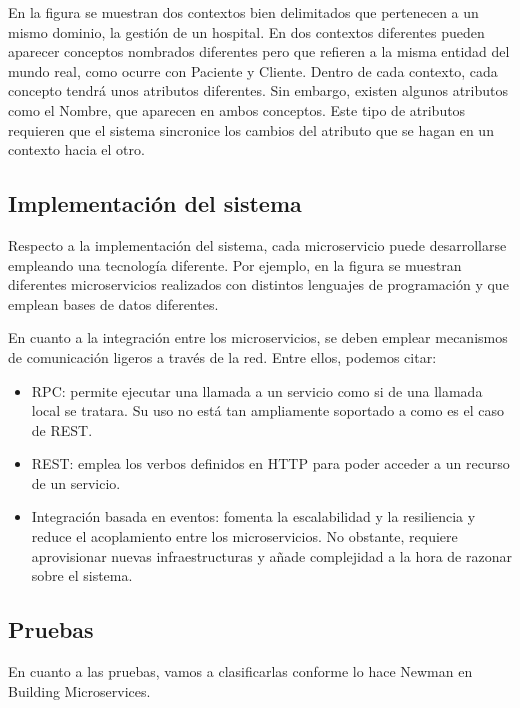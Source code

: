 \documentclass[11pt,a4paper]{article}
\begin{document}
En la figura se muestran dos contextos bien delimitados que pertenecen a un mismo dominio, la gestión de un hospital. En dos contextos diferentes pueden aparecer conceptos nombrados diferentes pero que refieren a la misma entidad del mundo real, como ocurre con Paciente y Cliente. Dentro de cada contexto, cada concepto tendrá unos atributos diferentes. Sin embargo, existen algunos atributos como el Nombre, que aparecen en ambos conceptos. Este tipo de atributos requieren que el sistema sincronice los cambios del atributo que se hagan en un contexto hacia el otro.

\subsection{Implementación del sistema}

Respecto a la implementación del sistema, cada microservicio puede desarrollarse empleando una tecnología diferente. Por ejemplo, en la figura se muestran diferentes microservicios realizados con distintos lenguajes de programación y que emplean bases de datos diferentes.

En cuanto a la integración entre los microservicios, se deben emplear mecanismos de comunicación ligeros a través de la red. Entre ellos, podemos citar:

\begin{itemize}

\item RPC: permite ejecutar una llamada a un servicio como si de una llamada local se tratara. Su uso no está tan ampliamente soportado a como es el caso de REST.

\item REST: emplea los verbos definidos en HTTP para poder acceder a un recurso de un servicio.

\item Integración basada en eventos: fomenta la escalabilidad y la resiliencia  y reduce el acoplamiento entre los microservicios. No obstante, requiere aprovisionar nuevas infraestructuras y añade complejidad a la hora de razonar sobre el sistema.

\end{itemize}

\subsection{Pruebas}

En cuanto a las pruebas, vamos a clasificarlas conforme lo hace Newman en Building Microservices.
\end{document}

